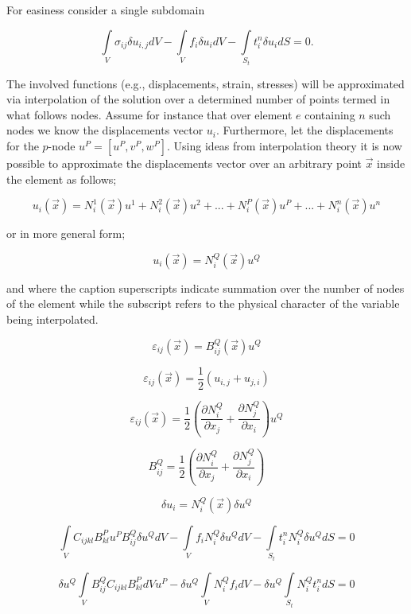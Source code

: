 For easiness consider a single subdomain

\begin{equation} \label{pvw_sing}
\int\limits_V {{\sigma _{ij}}\delta {u_{i,j}}dV - \int\limits_V {{f_i}\delta {u_i}dV - \int\limits_{{S_t}} {t_i^n} } } \delta {u_i}dS = 0.
\end{equation}

The involved functions (e.g., displacements, strain, stresses) will be approximated via interpolation of the solution over a determined number of points termed in what follows nodes. Assume for instance that over element $e$ containing $n$ such nodes we know the displacements vector $u_i$. Furthermore, let the displacements for the $p$-node $u^P=[u^P, v^P, w^P]$. Using ideas from interpolation theory it is now possible to approximate the displacements vector over an arbitrary point $\vec{x}$ inside the element as follows;

\[{u_i}(\vec x) = N_i^1(\vec x){u^1} + N_i^2(\vec x){u^2} + ... + N_i^P(\vec x){u^P} + ... + N_i^n(\vec x){u^n}\]

or in more general form;

\begin{equation} \label{bas_interpol}
{u_i}(\vec x) = N_i^Q(\vec x){u^Q}
\end{equation}

and where the caption superscripts indicate summation over the number of nodes of the element while the subscript refers to the physical character of the variable being interpolated.

\[{\varepsilon _{ij}}(\vec x) = B_{ij}^Q(\vec x){u^Q}\]

\[{\varepsilon _{ij}}(\vec x) = \frac{1}{2}\left( {{u_{i,j}} + {u_{j,i}}} \right)\]


\[{\varepsilon _{ij}}(\vec x) = \frac{1}{2}\left( {\frac{{\partial N_i^Q}}{{\partial {x_j}}} + \frac{{\partial N_j^Q}}{{\partial {x_i}}}} \right){u^Q}\]

\[B_{ij}^Q = \frac{1}{2}\left( {\frac{{\partial N_i^Q}}{{\partial {x_j}}} + \frac{{\partial N_j^Q}}{{\partial {x_i}}}} \right)\]

\[\delta {u_i} = N_i^Q(\vec x)\delta {u^Q}\]

\[\int\limits_V {{C_{ijkl}}B_{kl}^P{u^P}B_{ij}^Q\delta {u^Q}dV - \int\limits_V {{f_i}N_i^Q\delta {u^Q}dV}  - \int\limits_{{S_t}} {t_i^nN_i^Q\delta {u^Q}dS = 0} } \]

\[\delta {u^Q}\int\limits_V {B_{ij}^Q{C_{ijkl}}B_{kl}^PdV{u^P} - \delta {u^Q}\int\limits_V {N_i^Q{f_i}dV}  - \delta {u^Q}\int\limits_{{S_t}} {N_i^Qt_i^ndS = 0} } \]

